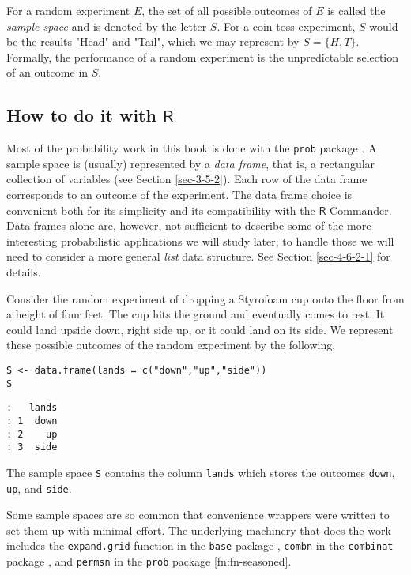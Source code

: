 For a random experiment \(E\), the set of all possible outcomes of
\(E\) is called the \emph{sample space}  and is denoted
by the letter \(S\). For a coin-toss experiment, \(S\) would be the
results "Head" and "Tail", which we may represent by \( S = \{H,T
\} \). Formally, the performance of a random experiment is the
unpredictable selection of an outcome in \(S\).

\subsection{How to do it with \(\mathsf{R}\)}
\label{sec-4-1-1}

Most of the probability work in this book is done with the \texttt{prob}
package \cite{prob}. A sample space is (usually) represented by a
\emph{data frame}, that is, a rectangular collection of variables (see
Section \ref{sec-3-5-2}). Each row of the data frame corresponds to
an outcome of the experiment. The data frame choice is convenient both
for its simplicity and its compatibility with the \(\mathsf{R}\)
Commander. Data frames alone are, however, not sufficient to describe
some of the more interesting probabilistic applications we will study
later; to handle those we will need to consider a more general \emph{list}
data structure. See Section \ref{sec-4-6-2-1} for details.


Consider the random experiment of dropping a Styrofoam cup onto the
floor from a height of four feet. The cup hits the ground and
eventually comes to rest. It could land upside down, right side up, or
it could land on its side. We represent these possible outcomes of the
random experiment by the following.

\begin{verbatim}
S <- data.frame(lands = c("down","up","side"))
S
\end{verbatim}

\begin{verbatim}
:   lands
: 1  down
: 2    up
: 3  side
\end{verbatim}

The sample space \texttt{S} contains the column \texttt{lands} which stores the
outcomes \texttt{down}, \texttt{up}, and \texttt{side}.



Some sample spaces are so common that convenience wrappers were
written to set them up with minimal effort. The underlying machinery
that does the work includes the \texttt{expand.grid} function in the \texttt{base}
package \cite{base}, \texttt{combn} in the \texttt{combinat} package
\cite{combinat}, and \texttt{permsn} in the \texttt{prob} package
\cite{prob}[fn:fn-seasoned].

